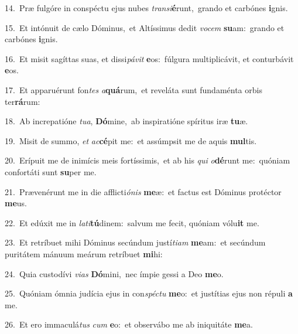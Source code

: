 {\numbfont\textcolor{\numbcolor}{14.}}~Præ fulgóre in conspéctu ejus nubes \textit{trans}\-\textit{i}\textbf{é}runt,~\star grando et carbónes \textbf{i}\-gnis.\par
{\numbfont\textcolor{\numbcolor}{15.}}~Et intónuit de cælo Dóminus,~\dagger et Altíssimus dedit \textit{vo}\-\textit{cem} \textbf{su}\-am:~\star grando et carbónes \textbf{i}\-gnis.\par
{\numbfont\textcolor{\numbcolor}{16.}}~Et misit sagíttas suas, et dissi\-\textit{pá}\-\textit{vit} \textbf{e}\-os:~\star fúlgura multiplicávit, et conturbávit \textbf{e}\-os.\par
{\numbfont\textcolor{\numbcolor}{17.}}~Et apparuérunt fon\textit{tes} \textit{a}\-\textbf{quá}rum,~\star et reveláta sunt fundaménta orbis ter\-\textbf{rá}\-rum:\par
{\numbfont\textcolor{\numbcolor}{18.}}~Ab increpatióne \textit{tu}\-\textit{a}, \textbf{Dó}\-mine,~\star ab inspiratióne spíritus iræ \textbf{tu}\-æ.\par
{\numbfont\textcolor{\numbcolor}{19.}}~Misit de summo, \textit{et} \textit{ac}\-\textbf{cé}pit me:~\star et assúmpsit me de aquis \textbf{mul}\-tis.\par
{\numbfont\textcolor{\numbcolor}{20.}}~Erípuit me de inimícis meis fortíssimis,~\dagger et ab his \textit{qui} \textit{o}\-\textbf{dé}runt me:~\star quóniam confortáti sunt \textbf{su}\-per me.\par
{\numbfont\textcolor{\numbcolor}{21.}}~Prævenérunt me in die afflicti\-\textit{ó}\-\textit{nis} \textbf{me}\-æ:~\star et factus est Dóminus protéctor \textbf{me}\-us.\par
{\numbfont\textcolor{\numbcolor}{22.}}~Et edúxit me in \textit{la}\-\textit{ti}\textbf{tú}dinem:~\star salvum me fecit, quóniam vólu\textbf{it} me.\par
{\numbfont\textcolor{\numbcolor}{23.}}~Et retríbuet mihi Dóminus secúndum justí\-\textit{ti}\-\textit{am} \textbf{me}\-am:~\star et secúndum puritátem mánuum meárum retríbuet \textbf{mi}\-hi:\par
{\numbfont\textcolor{\numbcolor}{24.}}~Quia custodívi \textit{vi}\-\textit{as} \textbf{Dó}\-mini,~\star nec ímpie gessi a Deo \textbf{me}\-o.\par
{\numbfont\textcolor{\numbcolor}{25.}}~Quóniam ómnia judícia ejus in con\-\textit{spéc}\-\textit{tu} \textbf{me}\-o:~\star et justítias ejus non répuli \textbf{a} me.\par
{\numbfont\textcolor{\numbcolor}{26.}}~Et ero immaculá\textit{tus} \textit{cum} \textbf{e}\-o:~\star et observábo me ab iniquitáte \textbf{me}\-a.\par
